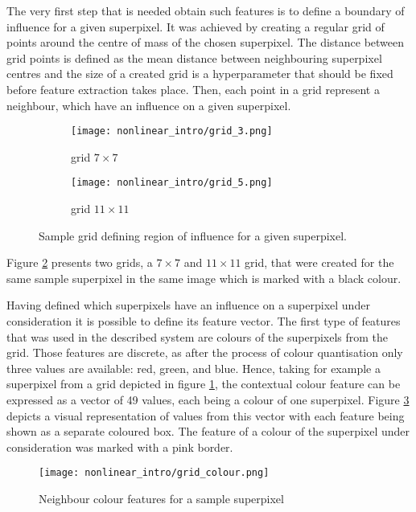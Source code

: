 The very first step that is needed obtain such features is to define a boundary of influence for a given superpixel. It was achieved by creating a regular grid of points around the centre of mass of the chosen superpixel. The distance between grid points is defined as the mean distance between neighbouring superpixel centres and the size of a created grid is a hyperparameter that should be fixed before feature extraction takes place. Then, each point in a grid represent a neighbour, which have an influence on a given superpixel.
\begin{figure}[ht]
    \centering
    \begin{subfigure}[h]{0.40\textwidth}
        \texttt{[image: nonlinear\_intro/grid\_3.png]}
        \caption{grid $7 \times 7$}
        \label{fig:grid_7_7}
      \end{subfigure}
    \begin{subfigure}[h]{0.40\textwidth}
        \texttt{[image: nonlinear\_intro/grid\_5.png]}
        \caption{grid $11 \times 11$}
      \end{subfigure}
    \caption{Sample grid defining region of influence for a given superpixel.}
    \label{fig:nonlinear_grid}
\end{figure}
 Figure \ref{fig:nonlinear_grid} presents two grids, a $7 \times 7$ and $11 \times 11$ grid, that were created for the same sample superpixel in the same image which is marked with a black colour.

Having defined which superpixels have an influence on a superpixel under consideration it is possible to define its feature vector. The first type of features that was used in the described system are colours of the superpixels from the grid. Those features are discrete, as after the process of colour quantisation only three values are available: red, green, and blue. Hence, taking for example a superpixel from a grid depicted in figure \ref{fig:grid_7_7}, the contextual colour feature can be expressed as a vector of 49 values, each being a colour of one superpixel. Figure \ref{fig:grid_colour} depicts a visual representation of values from this vector with each feature being shown as a separate coloured box. The feature of a colour of the superpixel under consideration was marked with a pink border.
\begin{figure}[ht]
    \centering
    \texttt{[image: nonlinear\_intro/grid\_colour.png]}
    \caption{Neighbour colour features for a sample superpixel}
    \label{fig:grid_colour}
\end{figure}

